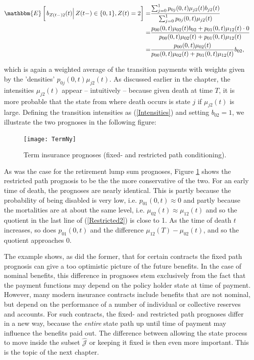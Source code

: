 \documentclass{article}
\newcommand{\1}[1]{\mathbbm{1}_{\left\lbrace #1 \right\rbrace}}
\newcommand{\econd}[2][def]{\mathbbm{E} \left[ \left. #1 \right| #2 \right]}
\theoremstyle{break}
\theoremstyle{remark}
\numberwithin{equation}{section}
\begin{document}
\begin{align} \label{Restricted2}
\begin{split}
	\econd[b_{Z(t-)2}(t)]{Z(t-) \in \{ 0,1 \}, Z(t)=2} =& \frac{\sum_{j=0}^1 p_{0j}(0,t) \mu_{j2}(t) b_{j2}(t)}{\sum_{j=0}^1 p_{0j}(0,t) \mu_{j2}(t)} \\
	=&\frac{p_{00}(0,t) \mu_{02}(t) b_{02} + p_{01}(0,t) \mu_{12}(t) \cdot 0}{p_{00}(0,t) \mu_{02}(t) + p_{01}(0,t) \mu_{12}(t)} \\
	=&\frac{p_{00}(0,t) \mu_{02}(t)}{p_{00}(0,t) \mu_{02}(t) + p_{01}(0,t) \mu_{12}(t)} b_{02},
\end{split}
\end{align}

which is again a weighted average of the transition payments with weights given by the 'densities' $p_{0j}(0,t) \mu_{j2}(t)$. As discussed earlier in the chapter, the intensities $\mu_{j2}(t)$ appear -- intuitively -- because given death at time $T$, it is more probable that the state from where death occurs is state $j$ if $\mu_{j2}(t)$ is large. Defining the transition intensities as (\ref{Intensities}) and setting $b_{02} = 1$, we illustrate the two prognoses in the following figure:

\begin{figure}[H]
	\centering
	\caption{Term insurance prognoses (fixed- and restricted path conditioning).}
	\texttt{[image: TermNy]} \label{Term}
\end{figure}

As was the case for the retirement lump sum prognoses, Figure \ref{Term} shows the restricted path prognosis to be the the more conservative of the two. For an early time of death, the prognoses are nearly identical. This is partly because the probability of being disabled is very low, i.e. $p_{01}(0,t) \approx 0$ and partly because the mortalities are at about the same level, i.e. $\mu_{02}(t) \approx \mu_{12}(t)$ and so the quotient in the last line of (\ref{Restricted2}) is close to 1. As the time of death $t$ increases, so does $p_{01}(0,t)$ and the difference $\mu_{12}(T) - \mu_{02}(t)$, and so the quotient approaches 0.

The example shows, as did the former, that for certain contracts the fixed path prognosis can give a too optimistic picture of the future benefits. In the case of nominal benefits, this difference in prognoses stem exclusively from the fact that the payment functions may depend on the policy holder state at time of payment. However, many modern insurance contracts include benefits that are not nominal, but depend on the performance of a number of individual or collective reserves and accounts. For such contracts, the fixed- and restricted path prognoses differ in a new way, because the \textit{entire} state path up until time of payment may influence the benefits paid out. The difference between allowing the state process to move inside the subset $\hat{\mathcal{J}}$ or keeping it fixed is then even more important. This is the topic of the next chapter.
\end{document}
